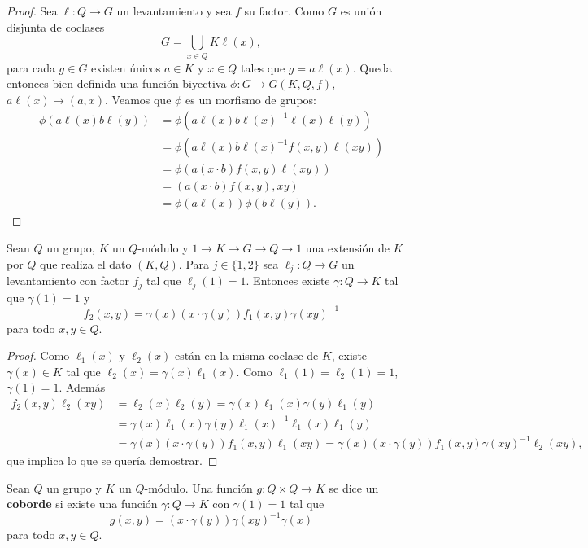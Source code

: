 \begin{proof}
	Sea $\ell\colon Q\to G$ un levantamiento y sea $f$ su factor. Como $G$ es
	unión disjunta de coclases
	\[
		G=\bigcup_{x\in Q}K\ell(x),
	\]
	para cada $g\in G$ existen únicos $a\in K$ y $x\in Q$ tales que
	$g=a\ell(x)$. Queda entonces bien definida una función biyectiva
	$\phi\colon G\to G(K,Q,f)$, $a\ell(x)\mapsto (a,x)$. Veamos que $\phi$ es
	un morfismo de grupos: 
	\begin{align*}
		\phi(a\ell(x)b\ell(y)) 
		&=\phi(a\ell(x)b\ell(x)^{-1}\ell(x)\ell(y))\\
		&=\phi(a\ell(x)b\ell(x)^{-1}f(x,y)\ell(xy))\\
		&=\phi(a(x\cdot b)f(x,y)\ell(xy))\\
		&=(a(x\cdot b)f(x,y),xy)\\
		&=\phi(a\ell(x))\phi(b\ell(y)).
	\end{align*}
\end{proof}

\begin{lemma}
	\label{lemma:coborde}
	Sean $Q$ un grupo, $K$ un $Q$-módulo y $1\to K\to G\to Q\to 1$ una
	extensión de $K$ por $Q$ que realiza el dato $(K,Q)$. Para $j\in\{1,2\}$
	sea $\ell_j\colon Q\to G$ un levantamiento con factor $f_j$ tal que
	$\ell_j(1)=1$.  Entonces existe $\gamma\colon Q\to K$ tal que $\gamma(1)=1$
	y 
	\[
		f_2(x,y)=\gamma(x)(x\cdot \gamma(y))f_1(x,y)\gamma(xy)^{-1}
	\]
	para todo $x,y\in Q$.
\end{lemma}

\begin{proof}
	Como $\ell_1(x)$ y $\ell_2(x)$ están en la misma coclase de
	$K$, existe $\gamma(x)\in K$ tal que $\ell_2(x)=\gamma(x)\ell_1(x)$. Como
	$\ell_1(1)=\ell_2(1)=1$, $\gamma(1)=1$. Además 
	\begin{align*}
		f_2(x,y)\ell_2(xy)&=\ell_2(x)\ell_2(y) = \gamma(x)\ell_1(x)\gamma(y)\ell_1(y)\\
		&=\gamma(x)\ell_1(x)\gamma(y)\ell_1(x)^{-1}\ell_1(x)\ell_1(y)\\
		&=\gamma(x)(x\cdot \gamma(y))f_1(x,y)\ell_1(xy)
		=\gamma(x)(x\cdot \gamma(y))f_1(x,y)\gamma(xy)^{-1}\ell_2(xy),
	\end{align*}
	que implica lo que se quería demostrar.
\end{proof}

\begin{definition}
	Sean $Q$ un grupo y $K$ un $Q$-módulo. Una función $g\colon Q\times Q\to K$
	se dice un \textbf{coborde} si existe una función $\gamma\colon Q\to K$ con
	$\gamma(1)=1$ tal que
	\[
	g(x,y)=(x\cdot \gamma(y))\gamma(xy)^{-1}\gamma(x)
	\]
	para todo $x,y\in Q$.
\end{definition}

